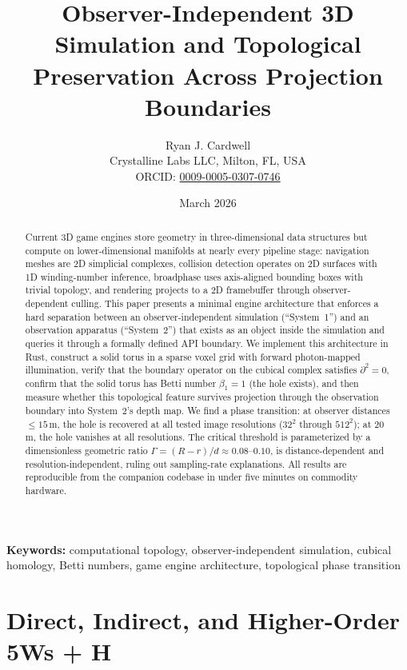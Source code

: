 \documentclass[11pt,a4paper]{article}
\title{\textbf{Observer-Independent 3D Simulation and Topological Preservation Across Projection Boundaries}}
\author{
  Ryan J. Cardwell \\
  Crystalline Labs LLC, Milton, FL, USA \\
  ORCID: \href{https://orcid.org/0009-0005-0307-0746}{0009-0005-0307-0746}
}
\date{March 2026}
\theoremstyle{remark}
\begin{document}
\maketitle

\begin{abstract}
Current 3D game engines store geometry in three-dimensional data structures but compute on lower-dimensional manifolds at nearly every pipeline stage: navigation meshes are 2D simplicial complexes, collision detection operates on 2D surfaces with 1D winding-number inference, broadphase uses axis-aligned bounding boxes with trivial topology, and rendering projects to a 2D framebuffer through observer-dependent culling. This paper presents a minimal engine architecture that enforces a hard separation between an observer-independent simulation (``System~1'') and an observation apparatus (``System~2'') that exists as an object inside the simulation and queries it through a formally defined API boundary. We implement this architecture in Rust, construct a solid torus in a sparse voxel grid with forward photon-mapped illumination, verify that the boundary operator on the cubical complex satisfies $\partial^2 = 0$, confirm that the solid torus has Betti number $\beta_1 = 1$ (the hole exists), and then measure whether this topological feature survives projection through the observation boundary into System~2's depth map. We find a phase transition: at observer distances $\leq 15$\,m, the hole is recovered at all tested image resolutions ($32^2$ through $512^2$); at 20\,m, the hole vanishes at all resolutions. The critical threshold is parameterized by a dimensionless geometric ratio $\Gamma = (R - r)/d \approx 0.08$--$0.10$, is distance-dependent and resolution-independent, ruling out sampling-rate explanations. All results are reproducible from the companion codebase in under five minutes on commodity hardware.
\end{abstract}

\vspace{1em}
\noindent\textbf{Keywords:} computational topology, observer-independent simulation, cubical homology, Betti numbers, game engine architecture, topological phase transition

\section{Direct, Indirect, and Higher-Order 5Ws + H}
\label{sec:5wh}
\end{document}
